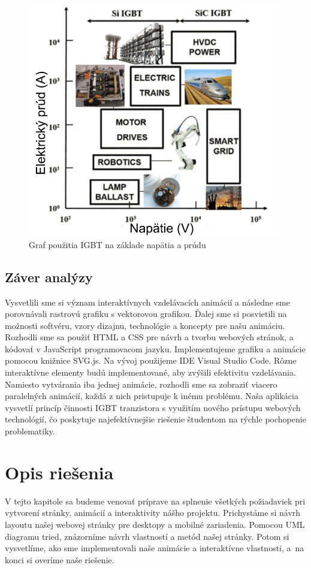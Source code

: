 \begin{figure}[!htbp]
    \centering
    \includegraphics[width=11cm]{img/igbtapp.PNG}
    \caption{Graf použitia IGBT na základe napätia a prúdu \cite{c23}}
    \label{IGBTApp}
\end{figure}

\newpage

\subsection{Záver analýzy}
Vysvetlili sme si význam interaktívnych vzdelávacích animácií a následne sme porovnávali rastrovú grafiku s vektorovou grafikou. Ďalej sme si posvietili na  možnosti softvéru, vzory dizajnu, technológie a koncepty pre našu animáciu. Rozhodli sme sa použiť HTML a CSS pre návrh a tvorbu webových stránok, a kódovať v JavaScript programovacom jazyku. Implementujeme grafiku a animácie pomocou knižnice SVG.js. Na vývoj použijeme IDE Visual Studio Code. Rôzne interaktívne elementy budú implementované, aby zvýšili efektivitu vzdelávania. Namiesto vytvárania iba jednej animácie, rozhodli sme sa zobraziť viacero paralelných animácií, každá z nich pristupuje k inému problému. Naša aplikácia vysvetlí princíp činnosti \acrshort{IGBT} tranzistora s využitím nového prístupu webových technológií, čo poskytuje najefektívnejšie riešenie  študentom na rýchle pochopenie problematiky.

\section{Opis riešenia}
V tejto kapitole sa budeme venovať príprave na splnenie všetkých požiadaviek pri  vytvorení stránky, animácií a interaktivity nášho projektu. Prichystáme si návrh layoutu našej webovej stránky pre desktopy a mobilné zariadenia. Pomocou \acrshort{UML} diagramu tried, znázorníme návrh vlastností a metód našej stránky. Potom si vysvetlíme, ako sme implementovali naše  animácie a interaktívne vlastnosti, a na konci si overíme naše riešenie.

